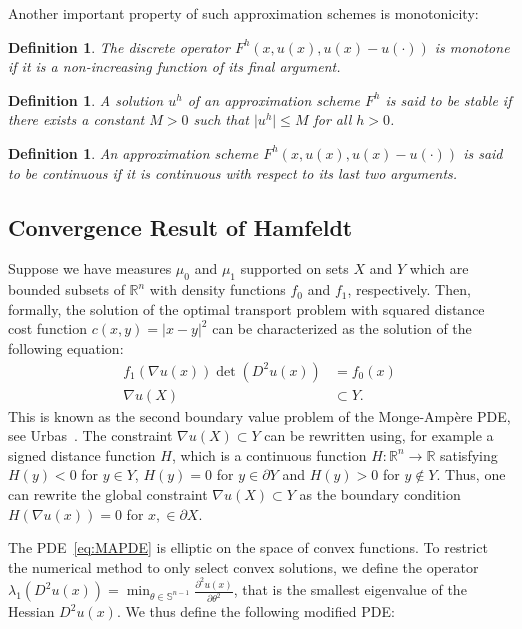 \documentclass{amsart}
\theoremstyle{lemma}
\newtheorem{definition}[theorem]{Definition}
\theoremstyle{remark}
\begin{document}
Another important property of such approximation schemes is monotonicity:
\begin{definition}
The discrete operator $F^h(x, u(x), u(x) - u(\cdot))$ is monotone if it is a non-increasing function of its final argument.
\end{definition}

\begin{definition}
A solution $u^h$ of an approximation scheme $F^h$ is said to be stable if there exists a constant $M>0$ such that $\vert u^h \vert \leq M$ for all $h>0$.
\end{definition}

\begin{definition}
An approximation scheme $F^h(x, u(x), u(x) - u(\cdot))$ is said to be continuous if it is continuous with respect to its last two arguments.
\end{definition}

\subsection{Convergence Result of Hamfeldt~\cite{HamfeldtBVP2}}\label{sec:Hamfeldt}

Suppose we have measures $\mu_0$ and $\mu_1$ supported on sets $X$ and $Y$ which are bounded subsets of $\mathbb{R}^n$ with density functions $f_0$ and $f_1$, respectively. Then, formally, the solution of the optimal transport problem with squared distance cost function $c(x,y) = \vert x - y \vert^2$ can be characterized as the solution of the following equation:
\begin{align}\label{eq:MAPDE}
f_1(\nabla u(x)) \det(D^2 u(x)) &= f_0(x) \\
\nabla u(X) &\subset Y.
\end{align}
This is known as the second boundary value problem of the Monge-Amp\`{e}re PDE, see Urbas~\cite{Urbas}. The constraint $\nabla u(X) \subset Y$ can be rewritten using, for example a signed distance function $H$, which is a continuous function $H: \mathbb{R}^n \rightarrow \mathbb{R}$ satisfying $H(y) < 0$ for $y \in Y$, $H(y)= 0$ for $y \in \partial Y$ and $H(y)>0$ for $y \notin Y$. Thus, one can rewrite the global constraint $\nabla u(X) \subset Y$ as the boundary condition $H(\nabla u(x)) = 0$ for $x, \in \partial X$.

The PDE~\ref{eq:MAPDE} is elliptic on the space of convex functions. To restrict the numerical method to only select convex solutions, we define the operator $\lambda_1(D^2u(x)) = \min_{\theta \in \mathbb{S}^{n-1}} \frac{\partial^2 u(x)}{\partial \theta^2}$, that is the smallest eigenvalue of the Hessian $D^2u(x)$. We thus define the following modified PDE:
\end{document}
